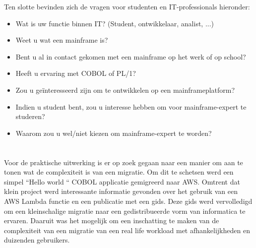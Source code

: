 Ten slotte bevinden zich de vragen voor studenten en IT-professionals hieronder:
 \begin{itemize}
    \item Wat is uw functie binnen IT? (Student, ontwikkelaar, analist, ...)
    \item Weet u wat een mainframe is?
    \item Bent u al in contact gekomen met een mainframe op het werk of op school?
    \item Heeft u ervaring met COBOL of PL/1?
    \item Zou u geïnteresseerd zijn om te ontwikkelen op een mainframeplatform?
    \item Indien u student bent, zou u interesse hebben om voor mainframe-expert te studeren?
    \item Waarom zou u wel/niet kiezen om mainframe-expert te worden?
\end{itemize}



\section{}
\label{sec:De praktische uitwerking}

Voor de praktische uitwerking is er op zoek gegaan naar een manier om aan te tonen wat de complexiteit is van een migratie. Om dit te schetsen werd een simpel ``Hello world `` COBOL applicatie gemigreerd naar AWS. Omtrent dat klein project werd interessante informatie gevonden over het gebruik van een AWS Lambda functie en een publicatie met een gids. Deze gids werd vervolledigd om een kleinschalige migratie naar een gedistribueerde vorm van informatica te ervaren. Daaruit was het mogelijk om een inschatting te maken van de complexiteit van een migratie van een real life workload met afhankelijkheden en duizenden gebruikers.
